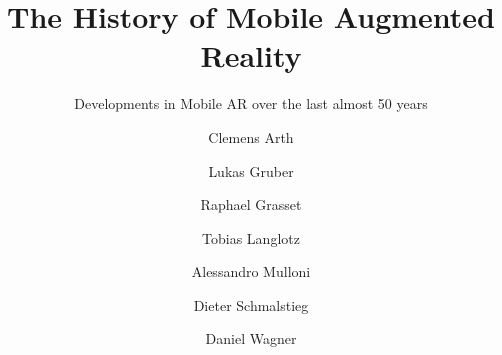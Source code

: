 \documentclass[12pt,a4paper]{article}
\begin{document}

\title{The History of Mobile Augmented Reality} 

\subtitle{
Developments in Mobile AR over the last almost 50 years
} 


\repdate{\today}          




















\author[ICG]{Clemens Arth}
\author[ICG]{Lukas Gruber}
\author[ICG]{Raphael Grasset}
\author[ICG]{Tobias Langlotz}
\author[ICG]{Alessandro Mulloni}
\author[ICG]{Dieter Schmalstieg}
\author[ICG]{Daniel Wagner}













\newcommand{\TUGn}{Graz University of Technology}

\address[ICG]{Inst. for Computer Graphics and Vision \\ \TUGn, Austria}














\end{document}
